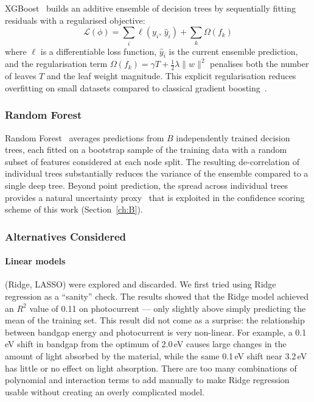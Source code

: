 XGBoost~\cite{chen2016xgboost} builds an additive ensemble of decision trees by
sequentially fitting residuals with a regularised objective:
\begin{equation}
  \mathcal{L}(\phi) =
    \sum_{i} \ell\!\left(y_i,\, \hat{y}_i\right)
    + \sum_{k} \Omega(f_k)
  \label{eq:xgb_loss}
\end{equation}
where $\ell$ is a differentiable loss function, $\hat{y}_i$ is the current
ensemble prediction, and the regularisation term
$\Omega(f_k) = \gamma T + \tfrac{1}{2}\lambda \|w\|^2$
penalises both the number of leaves $T$ and the leaf weight magnitude.
This explicit regularisation reduces overfitting on small datasets compared to
classical gradient boosting~\cite{friedman2001greedy}.

\subsubsection{Random Forest}

Random Forest~\cite{breiman2001random} averages predictions from $B$
independently trained decision trees, each fitted on a bootstrap sample of the
training data with a random subset of features considered at each node split.
The resulting de-correlation of individual trees substantially reduces the
variance of the ensemble compared to a single deep tree.
Beyond point prediction, the spread across individual trees provides a natural
uncertainty proxy~\cite{wager2014confidence} that is exploited in the confidence
scoring scheme of this work (Section~\ref{ch:B}).

\subsubsection{Alternatives Considered}

\paragraph{Linear models} (Ridge, LASSO) were explored and discarded.
We first tried using Ridge regression as a ``sanity'' check.
The results showed that the Ridge model achieved an $R^2$ value of 0.11 on
photocurrent --- only slightly above simply predicting the mean of the training set.
This result did not come as a surprise: the relationship between bandgap energy
and photocurrent is very non-linear.
For example, a 0.1\,eV shift in bandgap from the optimum of 2.0\,eV causes large
changes in the amount of light absorbed by the material, while the same 0.1\,eV
shift near 3.2\,eV has little or no effect on light absorption.
There are too many combinations of polynomial and interaction terms to add manually
to make Ridge regression usable without creating an overly complicated model.

